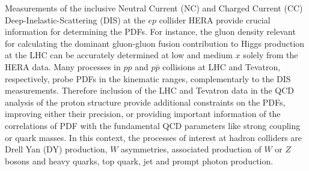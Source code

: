 Measurements of the inclusive Neutral Current (NC) and Charged Current (CC)  
Deep-Inelastic-Scattering (DIS) at the $ep$ collider HERA provide crucial information for determining the PDFs.
%
For instance, the gluon density relevant
for calculating the dominant gluon-gluon fusion contribution to Higgs production
at the LHC can be accurately determined at low and medium $x$ solely from the HERA data.
%
Many processes in $pp$ and $p \bar p$ collisions at LHC and Tevatron, respectively, 
probe PDFs in the kinematic ranges, complementarly to the DIS measurements. 
Therefore inclusion of the LHC and Tevatron data in the QCD analysis of the proton structure 
provide additional constraints on the PDFs, improving either their precision, 
or providing important information of the correlations of PDF with the fundamental 
QCD parameters like strong coupling or quark masses. 
%
%
In this context, the processes of interest at hadron colliders are
Drell Yan (DY) production, $W$ asymmetries, associated production of $W$ or $Z$ bosons 
and heavy quarks, top quark, jet and prompt photon production.
%


